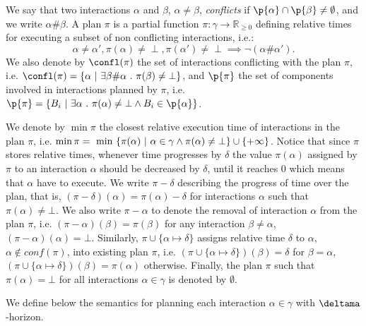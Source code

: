 \begin{definition}[Plan]\label{def:plan}
We say that two interactions $\alpha$ and $\beta$, $\alpha \neq \beta$, \emph{conflicts} if $\p{\alpha}\cap\p{\beta}\neq\emptyset$, and we write $\alpha\#\beta$.
A plan $\pi$ is a partial function $\pi:\gamma \to \mathbb{R}_{\ge 0}$ defining relative times for 
executing a subset of non conflicting interactions, i.e.:
\begin{displaymath}
  \alpha\neq\alpha',\pi(\alpha)\neq\perp,\pi(\alpha')\neq\perp\implies \neg(\alpha\#\alpha').
\end{displaymath}
We also denote by $\confl(\pi)$ the set of interactions conflicting with the plan $\pi$, i.e. $\confl(\pi) = \{ \alpha \ | \ \exists \beta \# \alpha \ . \ \pi (\beta) \neq \bot \}$, and $\p{\pi}$ the set of components involved in interactions planned by $\pi$, i.e. $\p{\pi} = \{ B_i \ | \ \exists \alpha \ . \ \pi(\alpha) \neq \bot \wedge B_i \in \p{\alpha} \}$.
\end{definition}
We denote by $\min\pi$ the closest relative execution time of interactions in the plan $\pi$, i.e. $\min\pi = \textnormal{ min } \{ \pi(\alpha) \ | \ \alpha \in \gamma \wedge \pi(\alpha) \neq \bot \} \cup \{ +\infty \}$.
Notice that since $\pi$ stores relative times, whenever time progresses by $\delta$ the value $\pi(\alpha)$ assigned by $\pi$ to an interaction $\alpha$ should be decreased by $\delta$, until it reaches $0$ which means that $\alpha$ have to execute.
We write $\pi-\delta$ describing the progress of time 
over the plan, that is, $(\pi-\delta)(\alpha) = \pi(\alpha) - \delta$ for interactions $\alpha$ such that $\pi(\alpha) \neq \bot$.
We also write
$\pi-\alpha$ to denote the removal of interaction $\alpha$ from the plan $\pi$, i.e. $(\pi-\alpha)(\beta) = \pi(\beta)$ for any interaction $\beta \neq \alpha$, $(\pi-\alpha)(\alpha) = \bot$.
Similarly, $\pi \cup \{ \alpha \mapsto \delta \}$ assigns relative time $\delta$ to $\alpha$, $\alpha \notin conf(\pi)$, into existing plan $\pi$, i.e. $(\pi \cup \{ \alpha \mapsto \delta \})(\beta) = \delta$ for $\beta = \alpha$, $(\pi \cup \{ \alpha \mapsto \delta \})(\beta) = \pi(\alpha)$ otherwise.
Finally, the plan $\pi$ such that $\pi(\alpha) = \bot$ for all interactions $\alpha \in \gamma$ is denoted by $\emptyset$.

We define below the semantics for planning each interaction $\alpha\in\gamma$ with $\deltama$-horizon.

